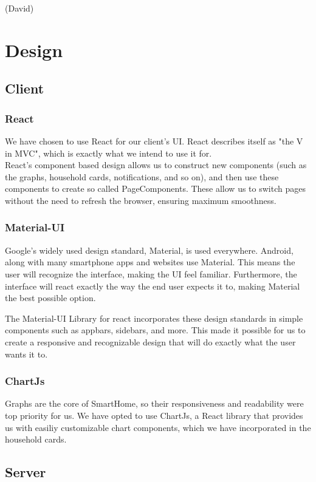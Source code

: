 \documentclass[11pt]{article}
\begin{document}
		(David)

\section{Design}
  \subsection{Client}
	\subsubsection{React}
		We have chosen to use React for our client's UI. React describes itself as "the V in MVC",
		which is exactly what we intend to use it for.\\
		
		React's component based design allows us to construct new components (such as the graphs, household cards, notifications, and so on),
		and then use these components to create so called PageComponents. These allow us to switch pages without the need to refresh the browser,
		ensuring maximum smoothness.

	\subsubsection{Material-UI}
		Google's widely used design standard, Material, is used everywhere. Android, along with many smartphone apps and websites use Material.
		This means the user will recognize the interface, making the UI feel familiar.
		Furthermore, the interface will react exactly the way the end user expects it to, making Material the best possible option.

		The Material-UI Library for react incorporates these design standards in simple components such as appbars, sidebars, and more.
		This made it possible for us to create a responsive and recognizable design that will do exactly what the user wants it to.
		
	\subsubsection{ChartJs}
		Graphs are the core of SmartHome, so their responsiveness and readability were top priority for us.
		We have opted to use ChartJs, a React library that provides us with easiliy customizable chart components,
		which we have incorporated in the household cards. 
		
  \subsection{Server}
\end{document}
